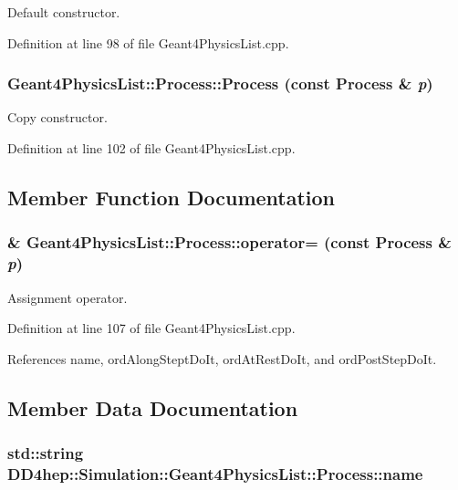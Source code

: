 Default constructor. 

Definition at line 98 of file Geant4PhysicsList.cpp.\hypertarget{class_d_d4hep_1_1_simulation_1_1_geant4_physics_list_1_1_process_a8a359fff64fa6b38ca4e8c26f55d82de}{
\subsubsection[{Process}]{\setlength{\rightskip}{0pt plus 5cm}Geant4PhysicsList::Process::Process (const {\bf Process} \& {\em p})}}
\label{class_d_d4hep_1_1_simulation_1_1_geant4_physics_list_1_1_process_a8a359fff64fa6b38ca4e8c26f55d82de}


Copy constructor. 

Definition at line 102 of file Geant4PhysicsList.cpp.

\subsection{Member Function Documentation}
\hypertarget{class_d_d4hep_1_1_simulation_1_1_geant4_physics_list_1_1_process_a979605cdba461548a4a86b9574ab4e60}{
\subsubsection[{operator=}]{ \& Geant4PhysicsList::Process::operator= (const {\bf Process} \& {\em p})}}
\label{class_d_d4hep_1_1_simulation_1_1_geant4_physics_list_1_1_process_a979605cdba461548a4a86b9574ab4e60}


Assignment operator. 

Definition at line 107 of file Geant4PhysicsList.cpp.

References name, ordAlongSteptDoIt, ordAtRestDoIt, and ordPostStepDoIt.

\subsection{Member Data Documentation}
\hypertarget{class_d_d4hep_1_1_simulation_1_1_geant4_physics_list_1_1_process_a215e1b0b76f9da5783f191129c1abf0d}{
\subsubsection[{name}]{\setlength{\rightskip}{0pt plus 5cm}std::string {\bf DD4hep::Simulation::Geant4PhysicsList::Process::name}}}
\label{class_d_d4hep_1_1_simulation_1_1_geant4_physics_list_1_1_process_a215e1b0b76f9da5783f191129c1abf0d}



